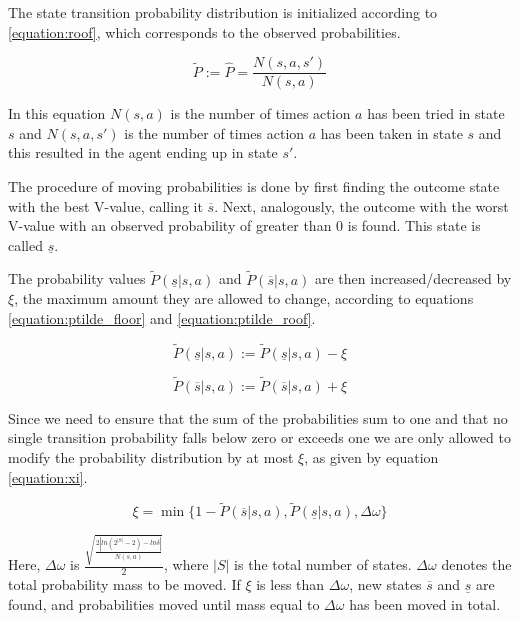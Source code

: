 The state transition probability distribution is initialized according to \ref{equation:roof}, which corresponds to the observed probabilities.

\begin{equation}
\label{equation:roof}
\tilde{P} := \hat{P} = \frac{N(s,a,s')}{N(s,a)}
\end{equation}

In this equation $N(s, a)$ is the number of times action $a$ has been tried in state $s$ and $N(s, a, s')$ is the number of times action $a$ has been taken in state $s$ and this resulted in the agent ending up in state $s'$.

The procedure of moving probabilities is done by first finding the outcome state with the best V-value, calling it $\overline{s}$. Next, analogously, the outcome with the worst V-value with an observed probability of greater than 0 is found. This state is called $\underline{s}$. 

The probability values $\tilde{P}(\underline{s}|s,a)$ and $\tilde{P}(\overline{s}|s,a)$ are then increased/decreased by $\xi$, the maximum amount they are allowed to change, according to equations \eqref{equation:ptilde_floor} and \eqref{equation:ptilde_roof}.


\begin{equation}
\label{equation:ptilde_floor}
\tilde{P}(\underline{s}|s,a) := \tilde{P}(\underline{s}|s,a)-\xi
\end{equation}

\begin{equation}
\label{equation:ptilde_roof}
\tilde{P}(\overline{s}|s,a) := \tilde{P}(\overline{s}|s,a)+\xi
\end{equation}

Since we need to ensure that the sum of the probabilities sum to one and that no single transition probability falls below zero or exceeds one we are only allowed to modify the probability distribution by at most $\xi$, as given by equation \ref{equation:xi}. 

\begin{equation}
\label{equation:xi}
\xi = \min\{
  1 - \tilde{P}(\overline{s} | s, a)
  , \tilde{P}(\underline{s} | s, a)
  , \Delta \omega 
\}
\end{equation}

Here, $\Delta \omega$ is $\frac{\sqrt{\frac{2|ln(2^{|S|}-2) - ln  \delta |}{N(s,a)}}}{2}$, where $|S|$ is the total number of states. $\Delta \omega$ denotes the total probability mass to be moved. If $\xi$ is less than $\Delta \omega$, new states $\overline{s}$ and $\underline{s}$ are found, and probabilities moved until mass equal to $\Delta \omega$ has been moved in total. 

